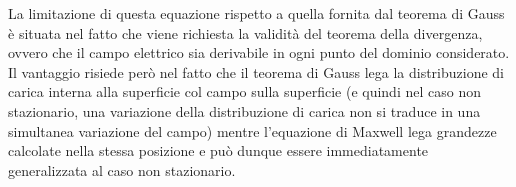 La limitazione di questa equazione rispetto a quella fornita dal teorema di Gauss è situata nel fatto che viene richiesta la
validità del teorema della divergenza, ovvero che il campo elettrico sia derivabile in ogni punto del dominio considerato. Il
vantaggio risiede però nel fatto che il teorema di Gauss lega la distribuzione di carica interna alla superficie col campo
sulla superficie (e quindi nel caso non stazionario, una variazione della distribuzione di carica non si traduce in una
simultanea variazione del campo) mentre l'equazione di Maxwell lega grandezze calcolate nella stessa posizione e può
dunque essere immediatamente generalizzata al caso non stazionario.

